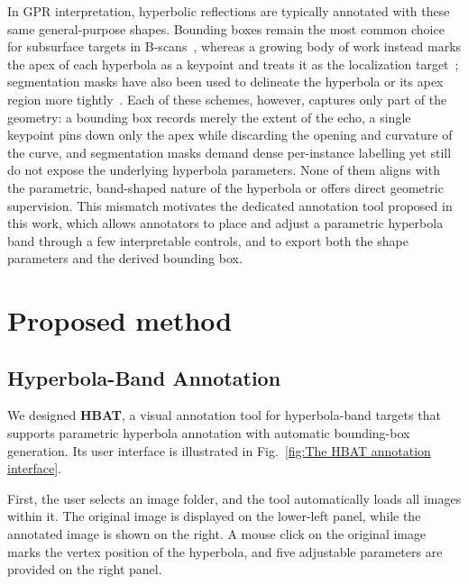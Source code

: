 \documentclass[lettersize,journal]{IEEEtran}
\begin{document}
In GPR interpretation, hyperbolic reflections are typically annotated with these
same general-purpose shapes. Bounding boxes remain the most common choice for
subsurface targets in B-scans~\cite{besaw2015deep}, whereas a growing body of
work instead marks the apex of each hyperbola as a keypoint and treats it as the
localization target~\cite{hou2025endtoend,lan2024statespace}; segmentation masks
have also been used to delineate the hyperbola or its apex region more
tightly~\cite{hou2021msrcnn}. Each of these schemes, however, captures only part
of the geometry: a bounding box records merely the extent of the echo, a single
keypoint pins down only the apex while discarding the opening and curvature of
the curve, and segmentation masks demand dense per-instance labelling yet still
do not expose the underlying hyperbola parameters. None of them aligns with the
parametric, band-shaped nature of the hyperbola or offers direct geometric
supervision. This mismatch motivates the dedicated annotation tool proposed in
this work, which allows annotators to place and adjust a parametric hyperbola
band through a few interpretable controls, and to export both the shape
parameters and the derived bounding box.


\section{Proposed method}
\subsection{Hyperbola-Band Annotation}
We designed \textbf{HBAT}, a visual annotation tool for hyperbola-band targets
that supports parametric hyperbola annotation with automatic bounding-box
generation. Its user interface is illustrated in Fig.~\ref{fig:The HBAT
annotation interface}.

First, the user selects an image folder, and the tool automatically loads all
images within it. The original image is displayed on the lower-left panel, while
the annotated image is shown on the right. A mouse click on the original image
marks the vertex position of the hyperbola, and five adjustable parameters are
provided on the right panel.
\end{document}

